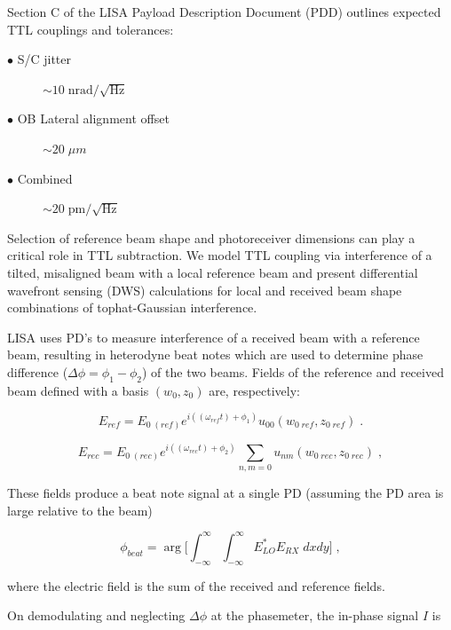 \documentclass[aps,twoside,secnumarabic,balancelastpage,amsmath,amssymb,nofootinbib,hyperref=pdftex]{revtex4}
\begin{document}
Section C of the LISA Payload Description Document (PDD) outlines expected TTL couplings and tolerances: 

\begin{description}
  \item[$\bullet$ S/C jitter] $ \sim  10\; \text{nrad}/\sqrt{\text{Hz}}$
  \item[$\bullet$ OB Lateral alignment offset] $\sim 20\; \mu m$
  \item[$\bullet$ Combined] $\sim 20\; \text{pm}/\sqrt{\text{Hz}}$
\end{description}

Selection of reference beam shape and photoreceiver dimensions
can play a critical role in TTL subtraction. We model TTL coupling via interference of a tilted, misaligned beam
with a local reference beam and present differential wavefront sensing (DWS) calculations for local and received beam
shape combinations of tophat-Gaussian interference.

\medskip

LISA uses PD's to measure interference of a received beam with a reference beam, resulting in heterodyne beat notes which are used to determine phase difference ($\Delta \phi = \phi_{1}-\phi_{2}$) of the two beams. Fields of the reference and received beam defined with a basis $(w_{0},z_{0})$ are, respectively:

\begin{equation} \label{eq:19}
	E_{ref} = 
		E_{0\; (ref)} e^{i(( \omega_{ref} t)+\phi_{1})}
		u_{00}(w_{0\; ref},z_{0\; ref})	
	\;.
\end{equation}

\begin{equation} \label{eq:18}
	E_{rec} = 
		E_{0\; (rec)} e^{i (( \omega_{rec}t)+\phi_{2})} 			
		\sum_{n,m=0}u_{nm}(w_{0\; rec},z_{0\; rec}) 		
	\;,
\end{equation}
	


These fields produce a beat note signal at a single PD (assuming the PD area is large relative to the beam)

\begin{equation}\label{eq:20}
	\phi_{beat}= \arg \Big[
	 \int_{- \infty}^{\infty}\int_{- \infty}^{\infty} E_{LO}^*E_{RX} \; dxdy
	 \Big ]
	 \; ,
\end{equation}

where the electric field is the sum of the received and reference fields. 

On demodulating and neglecting $\Delta \phi$ at the phasemeter, the in-phase signal $I$ is
\end{document}
